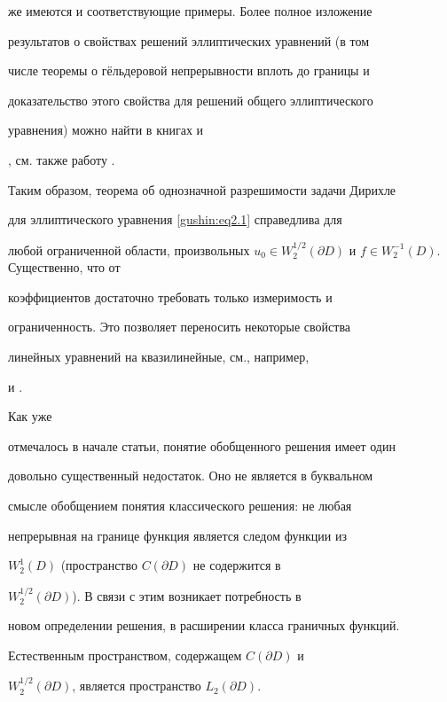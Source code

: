 же имеются и соответствующие примеры. Более полное изложение

результатов о свойствах решений эллиптических уравнений (в том

числе теоремы о гёльдеровой непрерывности вплоть до границы и

доказательство этого свойства для решений общего эллиптического

уравнения) можно найти в книгах \cite{gushin:LUr} и

\cite{gushin:GTr}, см. также работу \cite{gushin:KonLan}.



Таким образом, теорема об однозначной разрешимости задачи Дирихле

для эллиптического уравнения \eqref{gushin:eq2.1} справедлива для

любой ограниченной области, произвольных $u_0 \in

W^{1/2}_2(\partial D)$ и $f \in W^{-1}_2(D)$. Существенно, что от

коэффициентов достаточно требовать только измеримость и

ограниченность. Это позволяет переносить некоторые свойства

линейных уравнений на квазилинейные, см., например,

\cite{gushin:LUr} и \cite{gushin:GTr}.





\smallskip

\pagebreak



 Как уже

отмечалось в начале статьи, понятие обобщенного решения имеет один

довольно существенный недостаток. Оно не является в буквальном

смысле обобщением понятия классического решения: не любая

непрерывная на границе функция является следом функции из

$W_2^1(D)$ (пространство $C(\partial D)$ не содержится в

$W^{1/2}_2(\partial D)$). В связи с этим возникает потребность в

новом определении решения, в расширении класса граничных функций.

Естественным пространством, содержащем  $C(\partial D)$ и

$W^{1/2}_2(\partial D)$, является пространство $L_2(\partial D)$.



